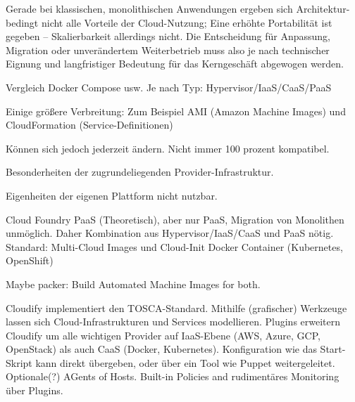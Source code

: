 \noindent
Gerade bei klassischen, monolithischen Anwendungen ergeben sich Architektur-bedingt nicht alle Vorteile der Cloud-Nutzung; Eine erhöhte Portabilität ist gegeben --  Skalierbarkeit allerdings nicht. Die Entscheidung für Anpassung, Migration oder unverändertem Weiterbetrieb muss also je nach technischer Eignung und langfristiger Bedeutung für das Kerngeschäft abgewogen werden.

Vergleich Docker Compose usw.
Je nach Typ: Hypervisor/IaaS/CaaS/PaaS

Einige größere Verbreitung: Zum Beispiel AMI (Amazon Machine Images) und CloudFormation (Service-Definitionen)

Können sich jedoch jederzeit ändern. Nicht immer 100 prozent kompatibel.

Besonderheiten der zugrundeliegenden Provider-Infrastruktur. 

Eigenheiten der eigenen Plattform nicht nutzbar.


Cloud Foundry PaaS (Theoretisch), aber nur PaaS, Migration von Monolithen unmöglich. Daher Kombination aus Hypervisor/IaaS/CaaS und PaaS nötig.
Standard:
Multi-Cloud Images und Cloud-Init
Docker Container (Kubernetes, OpenShift)

Maybe packer: Build Automated Machine Images for both.

%

Cloudify implementiert den TOSCA-Standard. Mithilfe (grafischer) Werkzeuge lassen sich Cloud-Infrastrukturen und Services modellieren. Plugins erweitern Cloudify um alle wichtigen Provider auf IaaS-Ebene (AWS, Azure, GCP, OpenStack) als auch CaaS (Docker, Kubernetes). Konfiguration wie das Start-Skript kann direkt übergeben, oder über ein Tool wie Puppet weitergeleitet. Optionale(?) AGents of Hosts. Built-in Policies and rudimentäres Monitoring über Plugins.

